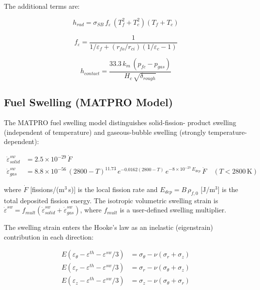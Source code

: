 \begin{refsection}
The additional terms are:

\begin{equation}
  h_{rad} = \sigma_{SB}\,f_\varepsilon\,(T_f^2 + T_c^2)(T_f + T_c)
  \label{eq:h_rad}
\end{equation}

\begin{equation}
  f_\varepsilon = \frac{1}{1/\varepsilon_f + (r_{fo}/r_{ci})(1/\varepsilon_c - 1)}
  \label{eq:frad}
\end{equation}

\begin{equation}
  h_{contact} = \frac{33.3\,k_m\,(p_{fc} - p_{gas})}{H_c\,\sqrt{\delta_{rough}}}
  \label{eq:h_contact}
\end{equation}

\subsection{Fuel Swelling (MATPRO Model)}
\label{sec:swelling}

The MATPRO fuel swelling model \cite{hagrman1981} distinguishes solid-fission- product swelling (independent of temperature) and gaseous-bubble swelling (strongly temperature-dependent):

\begin{align}
  \dot{\varepsilon}^{sw}_{solid}
    &= 2.5\times10^{-29}\,\dot{F}
    \label{eq:swel_solid}\\
  \dot{\varepsilon}^{sw}_{gas}
    &= 8.8\times10^{-56}\,(2800-T)^{11.73}\,
       e^{-0.0162(2800-T)}\,e^{-8\times10^{-27}\,E_{dep}}\,\dot{F}
    \quad (T < 2800\,\text{K})
  \label{eq:swel_gas}
\end{align}

where $\dot{F}$ [fissions/(m$^3$\,s)] is the local fission rate and $E_{dep} = B\,\rho_{f,0}$ [J/m$^3$] is the total deposited fission energy. The isotropic volumetric swelling strain is $\dot{\varepsilon}^{sw} = f_{mult}(\dot{\varepsilon}^{sw}_{solid} + \dot{\varepsilon}^{sw}_{gas})$, where $f_{mult}$ is a user-defined swelling multiplier.

The swelling strain enters the Hooke's law as an inelastic (eigenstrain) contribution in each direction:

\begin{align}
  E(\varepsilon_\theta - \varepsilon^{th} - \varepsilon^{sw}/3)
    &= \sigma_\theta - \nu(\sigma_r + \sigma_z) \\
  E(\varepsilon_r     - \varepsilon^{th} - \varepsilon^{sw}/3)
    &= \sigma_r     - \nu(\sigma_\theta + \sigma_z) \\
  E(\varepsilon_z     - \varepsilon^{th} - \varepsilon^{sw}/3)
    &= \sigma_z     - \nu(\sigma_\theta + \sigma_r)
\end{align}


\end{refsection}

